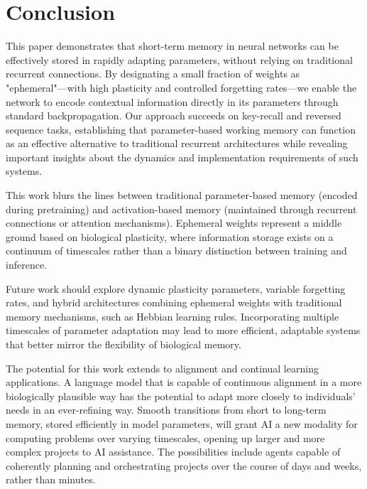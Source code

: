 \section{Conclusion}

This paper demonstrates that short-term memory in neural networks can be effectively stored in rapidly adapting parameters, without relying on traditional recurrent connections. By designating a small fraction of weights as "ephemeral"—with high plasticity and controlled forgetting rates—we enable the network to encode contextual information directly in its parameters through standard backpropagation. Our approach succeeds on key-recall and reversed sequence tasks, establishing that parameter-based working memory can function as an effective alternative to traditional recurrent architectures while revealing important insights about the dynamics and implementation requirements of such systems.

This work blurs the lines between traditional parameter-based memory (encoded during pretraining) and activation-based memory (maintained through recurrent connections or attention mechanisms). Ephemeral weights represent a middle ground based on biological plasticity, where information storage exists on a continuum of timescales rather than a binary distinction between training and inference.

Future work should explore dynamic plasticity parameters, variable forgetting rates, and hybrid architectures combining ephemeral weights with traditional memory mechanisms, such as Hebbian learning rules. Incorporating multiple timescales of parameter adaptation may lead to more efficient, adaptable systems that better mirror the flexibility of biological memory.

The potential for this work extends to alignment and continual learning applications. A language model that is capable of continuous alignment in a more biologically plausible way has the potential to adapt more closely to individuals' needs in an ever-refining way. Smooth transitions from short to long-term memory, stored efficiently in model parameters, will grant AI a new modality for computing problems over varying timescales, opening up larger and more complex projects to AI assistance. The possibilities include agents capable of coherently planning and orchestrating projects over the course of days and weeks, rather than minutes.